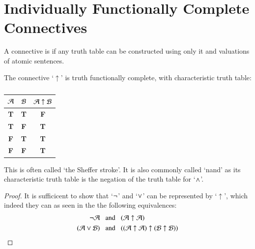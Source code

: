 \documentclass[12pt, a4paper, oneside, openright, titlepage]{book}
\begin{document}
\section{\textsection Individually Functionally Complete Connectives}

\begin{defn}
    A connective is  if any truth table can be constructed using only it and valuations of atomic sentences.
\end{defn}

\begin{defn}
    The connective `$\uparrow$' is truth functionally complete, with characteristic truth table: 
        \begin{table}[H]
            \centering
            \caption{}
            \begin{tabular}{cc|c}
                $\mathcal{A}$ & $\mathcal{B}$ & $\mathcal{A} \uparrow \mathcal{B}$\\ \hline
                \textbf{T} & \textbf{T} & \textbf{F} \\
                \textbf{T} & \textbf{F} & \textbf{T} \\
                \textbf{F} & \textbf{T} & \textbf{T} \\
                \textbf{F} & \textbf{F} & \textbf{T}
            \end{tabular}
        \end{table}
        This is often called `the Sheffer stroke'. It is also commonly called `nand' as its characteristic truth table is the negation of the truth table for `$\wedge$'.
\end{defn}
\begin{proof}
    It is sufficicent to show that `$\neg$' and `$\vee$' can be represented by `$\uparrow$', which indeed they can as seen in the the following equivalences: 
    \begin{align*}
        \neg\mathcal{A}\;\;&\text{ and }\;\;(\mathcal{A}\uparrow \mathcal{A}) \\
        (\mathcal{A}\vee\mathcal{B})\;\;&\text{ and }\;\;((\mathcal{A}\uparrow\mathcal{A})\uparrow(\mathcal{B}\uparrow\mathcal{B}))
    \end{align*}
\end{proof}
\end{document}
